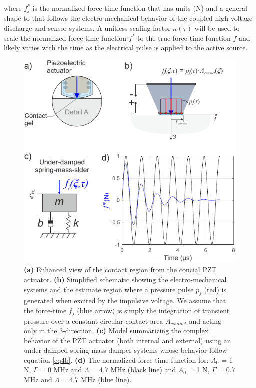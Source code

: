 \documentclass[preprint,3p, 11pt,authoryear]{elsarticle}
\begin{document}
\noindent where $f^{*}_{j}$ is the normalized force-time function that has units (N) and a general shape to that follows the electro-mechanical behavior of the coupled high-voltage discharge and sensor systems.  A unitless scaling factor $\kappa(\tau)$ will be used to scale the normalized force time-function $f^{*}$ to the true force-time function $f$ and likely varies with the time as the electrical pulse is applied to the active source.

\begin{figure}[ht]
     	\centering
\includegraphics[scale= 0.9]{FIG2b.pdf} 
\caption{\textbf{(a)} Enhanced view of the contact region from the concial PZT actuator. \textbf{(b)} Simplified schematic showing the electro-mechanical systems and the estimate region where a pressure pulse $p_{j}$ (red) is generated when excited by the impulsive voltage. We assume that the force-time $f_{j}$ (blue arrow) is simply the integration of transient pressure over a constant circular contact area $A_{contact}$ and acting only in the 3-direction.  \textbf{(c)} Model summarizing the complex behavior of the PZT actuator (both internal and external) using an under-damped spring-mass damper systems whose behavior follow equation \eqref{eq4b}. \textbf{(d)} The normalized force-time function for: $A_{0}$ = 1 N, $\Gamma$ = 0 MHz and $\Lambda$ = 4.7 MHz (black line) and $A_{0}$ = 1 N, $\Gamma$ = 0.7 MHz and $\Lambda$ = 4.7 MHz (blue line).}
	\label{fig2b} 
\end{figure}
\end{document}
